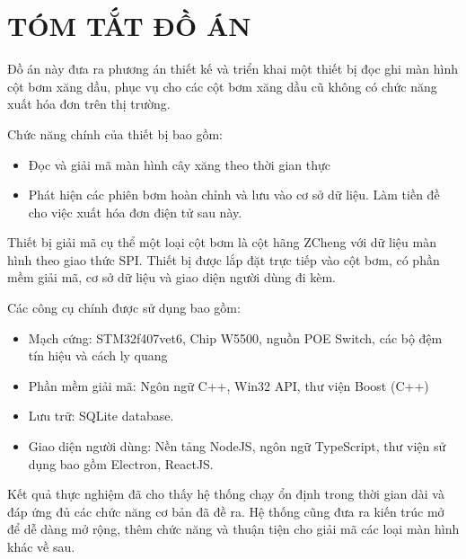\section*{TÓM TẮT ĐỒ ÁN}
    \thispagestyle{empty}

Đồ án này đưa ra phương án thiết kế và triển khai một thiết bị đọc ghi màn hình cột bơm xăng dầu, phục vụ cho các cột bơm xăng dầu cũ không có chức năng xuất hóa đơn trên thị trường.

Chức năng chính của thiết bị bao gồm:

\begin{itemize}
    \item Đọc và giải mã màn hình cây xăng theo thời gian thực 
    \item Phát hiện các phiên bơm hoàn chỉnh và lưu vào cơ sở dữ liệu. Làm tiền đề cho việc xuất hóa đơn điện tử sau này.
\end{itemize}

Thiết bị giải mã cụ thể một loại cột bơm là cột hãng ZCheng với dữ liệu màn hình theo giao thức SPI. Thiết bị được lắp đặt trực tiếp vào cột bơm, có phần mềm giải mã, cơ sở dữ liệu và giao diện người dùng đi kèm.

Các công cụ chính được sử dụng bao gồm:

\begin{itemize}
    \item Mạch cứng: STM32f407vet6, Chip W5500, nguồn POE Switch, các bộ đệm tín hiệu và cách ly quang
    \item Phần mềm giải mã: Ngôn ngữ C++, Win32 API, thư viện Boost (C++)
    \item Lưu trữ: SQLite database.
    \item Giao diện người dùng: Nền tảng NodeJS, ngôn ngữ TypeScript, thư viện sử dụng bao gồm Electron, ReactJS.
\end{itemize}

Kết quả thực nghiệm đã cho thấy hệ thống chạy ổn định trong thời gian dài và đáp ứng đủ các chức năng cơ bản đã đề ra. Hệ thống cũng đưa ra kiến trúc mở để dễ dàng mở rộng, thêm chức năng và thuận tiện cho giải mã các loại màn hình khác về sau. 
